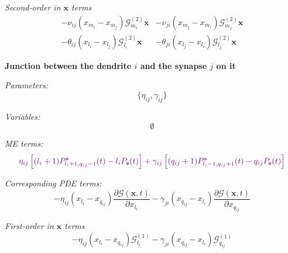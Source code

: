 \documentclass[a4paper, 11pt]{article}
\begin{document}
              {\it Second-order in $\mathbf x$ terms}
              \begin{align*}
                -\nu_{ij}\left(x_{m_i} - x_{m_j}\right)\boldsymbol{\mathcal G}_{m_i}^{(2)}\mathbf x& - \nu_{ji}\left(x_{m_j} - x_{m_i}\right)\boldsymbol{\mathcal G}_{m_j}^{(2)}\mathbf x\\
                - \theta_{ij}\left(x_{l_i}-x_{l_j}\right)\boldsymbol{\mathcal G}_{l_i}^{(2)}\mathbf x& - \theta_{ji}\left(x_{l_j} - x_{l_i}\right)\boldsymbol{\mathcal G}^{(2)}_{l_j}\mathbf x
              \end{align*}


              {\bf Junction between the dendrite $i$ and the synapse $j$ on it}
              
              {\it Parameters:}
              \begin{equation*}
                \{\eta_{ij}, \gamma_{ij}\}
              \end{equation*}

              {\it Variables:}
              \begin{equation*}
                \emptyset
              \end{equation*}

              {\it ME terms:}
              \begin{equation}
                \begin{split}
                  \textcolor{violet}{\eta_{ij}\left[(l_i+1)P_{l_i+1, q_{ij}-1}^{\mathbf s}(t) - l_iP_{\mathbf s}(t)\right] + \gamma_{ij}\left[(q_{ij}+1)P_{l_i-1, q_{ij}+1}^{\mathbf s}(t) - q_{ij}P_{\mathbf s}(t)\right]}
                \end{split}
              \end{equation}
              
              {\it Corresponding PDE terms:}
              \begin{equation}
                -\eta_{ij}(x_{l_i}-x_{q_{ij}})\frac{\partial\mathcal G(\mathbf x, t)}{\partial x_{l_i}} - \gamma_{ji}(x_{q_{ij}}-x_{l_i})\frac{\partial\mathcal G(\mathbf x, t)}{\partial x_{q_{ij}}}
              \end{equation}

              {\it First-order in $\mathbf x$ terms}
              \begin{equation}
                -\eta_{ij}(x_{l_i}-x_{q_{ij}})\mathcal G^{(1)}_{l_i} - \gamma_{ji}(x_{q_{ij}}-x_{l_i})\mathcal G^{(1)}_{q_{ij}}
              \end{equation}
\end{document}
